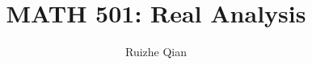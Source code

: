 \documentclass[12pt]{amsart}
\title{MATH 501: Real Analysis}
\author{Ruizhe Qian}
\date{}
\theoremstyle{plain}
\theoremstyle{remark}
\begin{document}
\onehalfspacing
\maketitle

\tableofcontents














\end{document}
